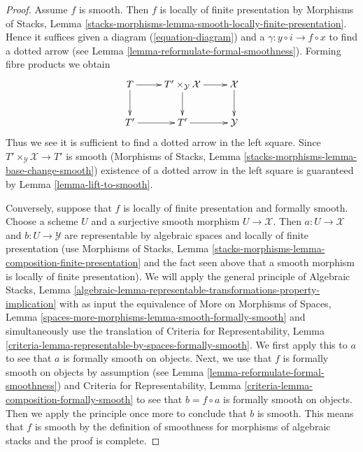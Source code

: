 \documentclass{stacks-project}
\theoremstyle{plain}
\theoremstyle{definition}
\theoremstyle{remark}
\numberwithin{equation}{subsection}
\begin{document}
\begin{proof}
Assume $f$ is smooth. Then $f$ is locally of finite presentation by
Morphisms of Stacks, Lemma
\ref{stacks-morphisms-lemma-smooth-locally-finite-presentation}.
Hence it suffices given a diagram (\ref{equation-diagram})
and a $\gamma : y \circ i \to f \circ x$ to find a dotted
arrow (see Lemma \ref{lemma-reformulate-formal-smoothness}).
Forming fibre products we obtain
$$
\xymatrix{
T \ar[d] \ar[r] &
T' \times_\mathcal{Y} \mathcal{X} \ar[d] \ar[r] &
\mathcal{X} \ar[d] \\
T' \ar[r] & T' \ar[r] & \mathcal{Y}
}
$$
Thus we see it is sufficient to find a dotted arrow in the
left square. Since $T' \times_\mathcal{Y} \mathcal{X} \to T'$
is smooth
(Morphisms of Stacks, Lemma \ref{stacks-morphisms-lemma-base-change-smooth})
existence of a dotted arrow in the left square is guaranteed by
Lemma \ref{lemma-lift-to-smooth}.

\medskip\noindent
Conversely, suppose that $f$ is locally of finite presentation and
formally smooth. Choose a scheme $U$ and a surjective smooth morphism
$U \to \mathcal{X}$. Then $a : U \to \mathcal{X}$ and $b : U \to \mathcal{Y}$
are representable by algebraic spaces and locally of finite presentation
(use Morphisms of Stacks, Lemma
\ref{stacks-morphisms-lemma-composition-finite-presentation}
and the fact seen above
that a smooth morphism is locally of finite presentation).
We will apply the general principle of
Algebraic Stacks, Lemma
\ref{algebraic-lemma-representable-transformations-property-implication}
with as input the equivalence of More on Morphisms of Spaces,
Lemma \ref{spaces-more-morphisms-lemma-smooth-formally-smooth}
and simultaneously use the translation of
Criteria for Representability, Lemma
\ref{criteria-lemma-representable-by-spaces-formally-smooth}.
We first apply this to $a$ to see that $a$ is
formally smooth on objects. Next, we use that $f$ is
formally smooth on objects by assumption
(see Lemma \ref{lemma-reformulate-formal-smoothness})
and Criteria for Representability, Lemma
\ref{criteria-lemma-composition-formally-smooth}
to see that $b = f \circ a$ is formally smooth on objects.
Then we apply the principle once more to conclude that $b$ is smooth.
This means that $f$ is smooth by the definition of smoothness
for morphisms of algebraic stacks and the proof is complete.
\end{proof}
\end{document}
